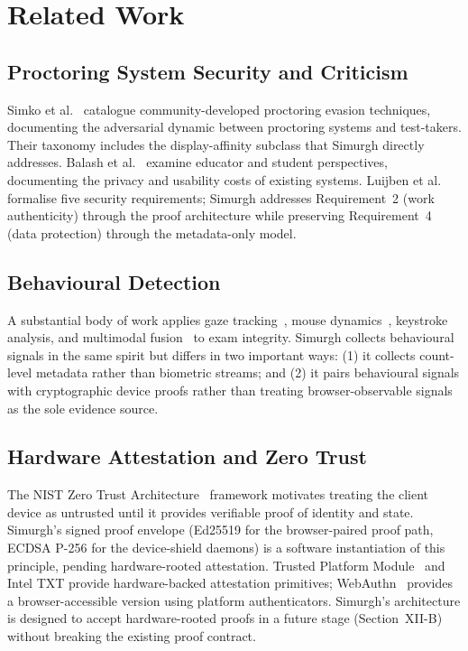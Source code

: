 \documentclass[conference]{IEEEtran}
\begin{document}
\section{Related Work}

\subsection{Proctoring System Security and Criticism}

Simko et al.~\cite{simko2024modern} catalogue community-developed proctoring evasion techniques, documenting the adversarial dynamic between proctoring systems and test-takers. Their taxonomy includes the display-affinity subclass that Simurgh directly addresses. Balash et al.~\cite{balash2023educators,balash2021examining} examine educator and student perspectives, documenting the privacy and usability costs of existing systems. Luijben et al.~\cite{luijben2024security} formalise five security requirements; Simurgh addresses Requirement~2 (work authenticity) through the proof architecture while preserving Requirement~4 (data protection) through the metadata-only model.

\subsection{Behavioural Detection}

A substantial body of work applies gaze tracking~\cite{kaddoura2023computational,ferdosi2023modeling}, mouse dynamics~\cite{wang2020user}, keystroke analysis, and multimodal fusion~\cite{guan2021design,atoum2017automated} to exam integrity. Simurgh collects behavioural signals in the same spirit but differs in two important ways: (1) it collects count-level metadata rather than biometric streams; and (2) it pairs behavioural signals with cryptographic device proofs rather than treating browser-observable signals as the sole evidence source.

\subsection{Hardware Attestation and Zero Trust}

The NIST Zero Trust Architecture~\cite{nist2020zerotrust} framework motivates treating the client device as untrusted until it provides verifiable proof of identity and state. Simurgh's signed proof envelope (Ed25519 for the browser-paired proof path, ECDSA P-256 for the device-shield daemons) is a software instantiation of this principle, pending hardware-rooted attestation. Trusted Platform Module~\cite{tpm2spec} and Intel TXT provide hardware-backed attestation primitives; WebAuthn~\cite{w3c2021webauthn} provides a browser-accessible version using platform authenticators. Simurgh's architecture is designed to accept hardware-rooted proofs in a future stage (Section~XII-B) without breaking the existing proof contract.
\end{document}
